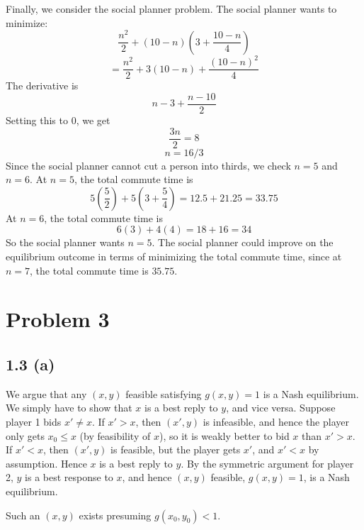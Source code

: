 \documentclass[10pt,letter]{article}
\begin{document}
Finally, we consider the social planner problem. The social planner wants to minimize:
\[ \frac{n^2}{2} + (10-n) \left(3 + \frac{10-n}{4} \right) \]
\[=  \frac{n^2}{2} + 3(10-n) + \frac{(10-n)^2}{4}  \]
The derivative is
\[ n - 3 + \frac{n-10}{2} \]
Setting this to 0, we get
\[ \frac{3n}{2} = 8\]
\[ n = 16/3 \]
Since the social planner cannot cut a person into thirds, we check $n=5$ and $n=6$. At $n=5$, the total commute time is
\[ 5\left(\frac{5}{2}\right) + 5\left(3 + \frac{5}{4} \right) = 12.5 + 21.25 = 33.75 \]
At $n=6$, the total commute time is
\[ 6(3) + 4(4) = 18 + 16 = 34 \]
So the social planner wants $n=5$. The social planner could improve on the equilibrium outcome in terms of minimizing the total commute time, since at $n=7$, the total commute time is $35.75$.

\section*{Problem 3}
\subsection*{1.3 (a)} We argue that any $(x,y)$ feasible satisfying $g(x,y)= 1$ is a Nash equilibrium. We simply have to show that $x$ is a best reply to $y$, and vice versa. Suppose player 1 bids $x' \neq x$. If $x' > x$, then $(x',y)$ is infeasible, and hence the player only gets $x_0 \le x$ (by feasibility of $x$), so it is weakly better to bid $x$ than $x' > x$. If $x' < x$, then $(x', y)$ is feasible, but the player gets $x'$, and $x' < x$ by assumption. Hence $x$ is a best reply to $y$. By the symmetric argument for player 2, $y$ is a best response to $x$, and hence $(x,y)$ feasible, $g(x,y) = 1$, is a Nash equilibrium.

Such an $(x,y)$ exists presuming $g(x_0, y_0) < 1$.
\end{document}
